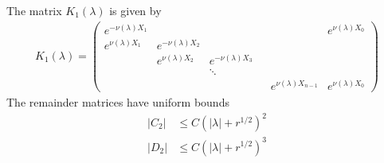 \documentclass[thesis.tex]{subfiles}
\begin{document}
\begin{lemma}
The matrix $K_1(\lambda)$ is given by
\begin{align*}
K_1(\lambda) =  
\begin{pmatrix}
e^{-\nu(\lambda)X_1} & & & & & e^{\nu(\lambda)X_0} \\
e^{\nu(\lambda)X_1} & e^{-\nu(\lambda)X_2} \\
& e^{\nu(\lambda)X_2} & e^{-\nu(\lambda)X_3} \\
 & & \ddots & &&   \\
& & & & e^{\nu(\lambda)X_{n-1}} & e^{\nu(\lambda)X_0}
\end{pmatrix}
\end{align*}
The remainder matrices have uniform bounds
\begin{align}\label{adjjumprem}
|C_2| &\leq C (|\lambda| + r^{1/2})^2 \\
|D_2| &\leq C (|\lambda| + r^{1/2})^3 
\end{align}


\end{lemma}
\end{document}
